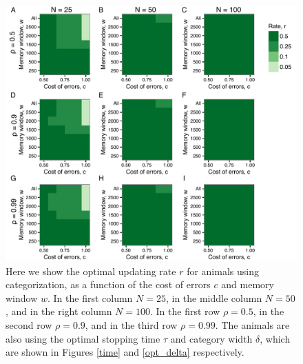 \begin{figure}
\includegraphics[width=6.85in]{figures/l_heat_maps.pdf}
\caption{\sffamily\small\textbf{} Here we show the optimal updating rate $r$ for animals using categorization, as a function of the cost of errors $c$ and memory window $w$. In the first column $N=25$, in the middle column $N=50$, and in the right column $N=100$. In the first row $\rho=0.5$, in the second row $\rho=0.9$, and in the third row $\rho=0.99$. The animals are also using the optimal stopping time $\tau$ and category width $\delta$, which are shown in Figures \ref{time} and \ref{opt_delta} respectively.}
\label{l}
\end{figure} 

